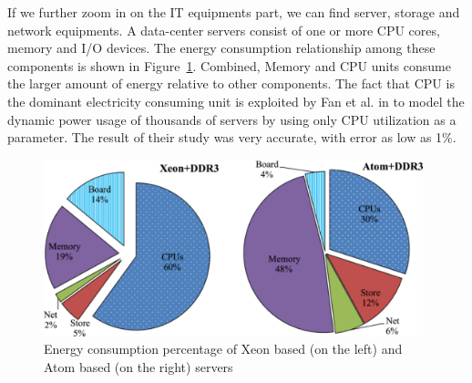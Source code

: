 If we further zoom in on the IT equipments part, we can find server, storage and network equipments. A data-center servers consist of one or more CPU cores, memory and I/O devices. The energy consumption relationship among these components is shown in Figure~\ref{fig:serverenergy}. Combined, Memory and CPU units consume the larger amount of energy relative to other components. The fact that CPU is the dominant electricity consuming unit is exploited by Fan et al. in \cite{DBLP:conf/isca/FanWB07} to model the dynamic power usage of thousands of servers by using only CPU utilization as a parameter. The result of their study was very accurate, with error as low as 1\%. 
\begin{figure}[ht]
	\begin{center}
		\includegraphics[width=11cm]{images/serverenergy.pdf}
		\caption{Energy consumption percentage of Xeon based (on the left) and Atom based (on the right) servers \cite{DBLP:journals/comsur/DayarathnaWF16}}
		\label{fig:serverenergy}
	\end{center}
\end{figure}



